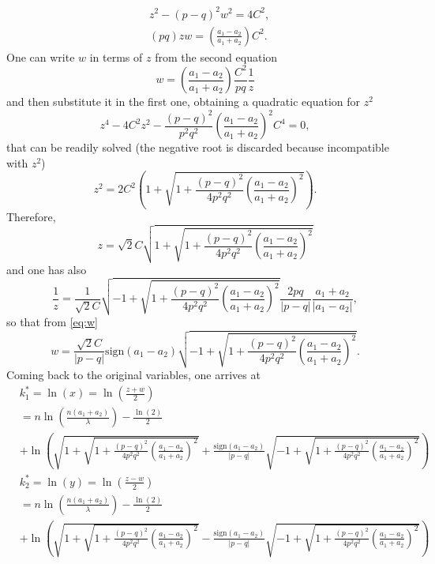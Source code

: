 \documentclass[a4paper,11pt]{article}
\numberwithin{equation}{section}
\begin{document}
\begin{align}
    &z^2 - (p-q)^2 w^2 = 4 C^2, \\
    & (pq) z w = \left( \frac{a_1-a_2}{a_1+a_2} \right) C^2.
\end{align}
One can write $w$ in terms of $z$ from the second equation
\begin{equation}\label{eq:w}
    w= \left(\frac{a_1-a_2}{a_1+a_2} \right)  \frac{C^2}{pq}\frac{1}{z}
\end{equation}
and then substitute it in the first one, obtaining a quadratic equation for $z^2$
\begin{equation}
    z^4 - 4C^2 z^2 - \frac{(p-q)^2}{p^2 q^2}\left(\frac{a_1-a_2}{a_1+a_2} \right)^2 C^4 =0,
\end{equation}
that can be readily solved (the negative root is discarded because incompatible with $z^2$)
\begin{equation}
    z^2 = 2 C^2 \left(1 + \sqrt{1 + \frac{(p-q)^2}{4 p^2 q^2}\left(\frac{a_1-a_2}{a_1+a_2} \right)^2 } \right).
\end{equation}
Therefore,
\begin{equation}
    z= \sqrt{2}C \sqrt{1 + \sqrt{1 + \frac{(p-q)^2}{4 p^2 q^2}\left(\frac{a_1-a_2}{a_1+a_2} \right)^2 }}
\end{equation}
and one has also
\begin{equation}
    \frac{1}{z}= \frac{1}{\sqrt{2}C} \sqrt{-1 +\sqrt{1 + \frac{(p-q)^2}{4 p^2 q^2}\left(\frac{a_1-a_2}{a_1+a_2} \right)^2 } } \frac{2pq}{|p-q|}\frac{a_1+a_2}{|a_1-a_2|} ,
\end{equation}
so that from \eqref{eq:w} 
\begin{equation}
    w= \frac{\sqrt{2}C}{|p-q|} \mathrm{sign}(a_1-a_2) \sqrt{-1 +\sqrt{1 + \frac{(p-q)^2}{4 p^2 q^2}\left(\frac{a_1-a_2}{a_1+a_2} \right)^2 } } .
\end{equation}
Coming back to the original variables, one arrives at
\begin{align}
    &k_1^* = \ln(x) = \ln \left(\frac{z+w}{2}\right) \\
    &=n \ln \left(\frac{n (a_1+a_2)}{\lambda}\right)  - \frac{\ln(2)}{2} \nonumber \\
    &+ \ln\left( \sqrt{1 + \sqrt{1 + \frac{(p-q)^2}{4 p^2 q^2}\left(\frac{a_1-a_2}{a_1+a_2} \right)^2 }} + \frac{\mathrm{sign}(a_1-a_2)}{|p-q|}\sqrt{-1 +\sqrt{1 + \frac{(p-q)^2}{4 p^2 q^2}\left(\frac{a_1-a_2}{a_1+a_2} \right)^2 } } \right)
\end{align}
\begin{align}
    &k_2^* = \ln(y) = \ln \left(\frac{z-w}{2}\right) \\
    &=n \ln \left(\frac{n (a_1+a_2)}{\lambda}\right)  - \frac{\ln(2)}{2} \nonumber  \\
    &+ \ln\left( \sqrt{1 + \sqrt{1 + \frac{(p-q)^2}{4 p^2 q^2}\left(\frac{a_1-a_2}{a_1+a_2} \right)^2 }} - \frac{\mathrm{sign}(a_1-a_2)}{|p-q|}\sqrt{-1 +\sqrt{1 + \frac{(p-q)^2}{4 p^2 q^2}\left(\frac{a_1-a_2}{a_1+a_2} \right)^2 } } \right)
\end{align}
\end{document}
